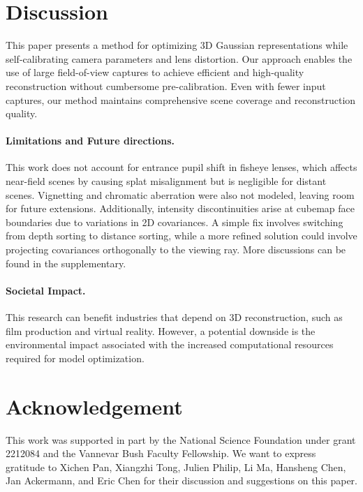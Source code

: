 

\section{Discussion}
\label{sec:discussions}

This paper presents a method for optimizing 3D Gaussian representations while self-calibrating camera parameters and lens distortion. 
Our approach enables the use of large field-of-view captures to achieve efficient and high-quality reconstruction without cumbersome pre-calibration. Even with fewer input captures, our method maintains comprehensive scene coverage and reconstruction quality.


\vspace{-1em}
\paragraph{Limitations and Future directions.} 
This work does not account for entrance pupil shift in fisheye lenses, which affects near-field scenes by causing splat misalignment but is negligible for distant scenes. Vignetting and chromatic aberration were also not modeled, leaving room for future extensions. Additionally, intensity discontinuities arise at cubemap face boundaries due to variations in 2D covariances. A simple fix involves switching from depth sorting to distance sorting, while a more refined solution could involve projecting covariances orthogonally to the viewing ray. More discussions can be found in the supplementary.


\paragraph{Societal Impact.} 
This research can benefit industries that depend on 3D reconstruction, such as film production and virtual reality. 
However, a potential downside is the environmental impact associated with the increased computational resources required for model optimization.

\section{Acknowledgement}
This work was supported in part by the National Science Foundation under grant 2212084 and the Vannevar Bush Faculty Fellowship.
We want to express gratitude to Xichen Pan, Xiangzhi Tong, Julien Philip, Li Ma, Hansheng Chen, Jan Ackermann, and Eric Chen for their discussion and suggestions on this paper. 

\clearpage